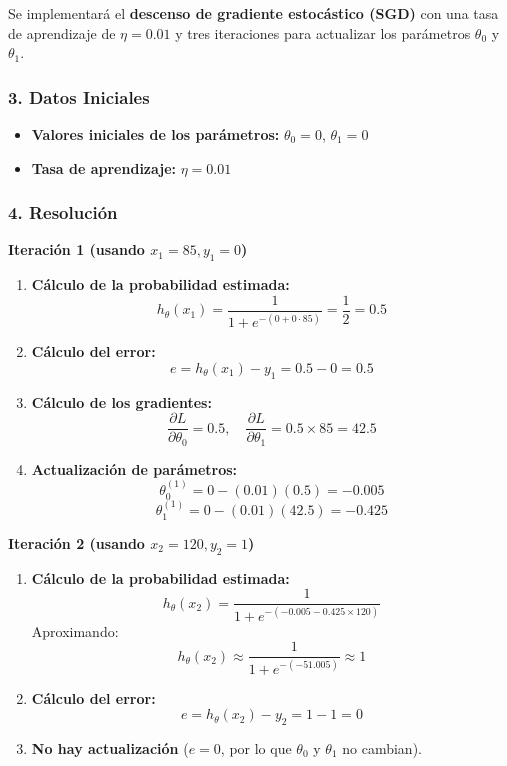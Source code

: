 \documentclass[a5paper]{article}
\begin{document}
	Se implementará el \textbf{descenso de gradiente estocástico (SGD)} con una tasa de aprendizaje de \( \eta = 0.01 \) y tres iteraciones para actualizar los parámetros \( \theta_0 \) y \( \theta_1 \).
	
	\subsubsection*{3. Datos Iniciales}
	
	\begin{itemize}
		\item \textbf{Valores iniciales de los parámetros:} \( \theta_0 = 0 \), \( \theta_1 = 0 \)
		\item \textbf{Tasa de aprendizaje:} \( \eta = 0.01 \)
	\end{itemize}
	
	\subsubsection*{4. Resolución}
	
	\textbf{Iteración 1 (usando \( x_1 = 85, y_1 = 0 \))}
	
	\begin{enumerate}
		\item \textbf{Cálculo de la probabilidad estimada:}
		\[
		h_\theta(x_1) = \frac{1}{1 + e^{-(0 + 0 \cdot 85)}} = \frac{1}{2} = 0.5
		\]
		
		\item \textbf{Cálculo del error:}
		\[
		e = h_\theta(x_1) - y_1 = 0.5 - 0 = 0.5
		\]
		
		\item \textbf{Cálculo de los gradientes:}
		\[
		\frac{\partial L}{\partial \theta_0} = 0.5, \quad \frac{\partial L}{\partial \theta_1} = 0.5 \times 85 = 42.5
		\]
		
		\item \textbf{Actualización de parámetros:}
		\[
		\theta_0^{(1)} = 0 - (0.01)(0.5) = -0.005
		\]
		\[
		\theta_1^{(1)} = 0 - (0.01)(42.5) = -0.425
		\]
	\end{enumerate}
	
	\textbf{Iteración 2 (usando \( x_2 = 120, y_2 = 1 \))}
	
	\begin{enumerate}
		\item \textbf{Cálculo de la probabilidad estimada:}
		\[
		h_\theta(x_2) = \frac{1}{1 + e^{-(-0.005 - 0.425 \times 120)}}
		\]
		Aproximando:
		\[
		h_\theta(x_2) \approx \frac{1}{1 + e^{-(-51.005)}} \approx 1
		\]
		
		\item \textbf{Cálculo del error:}
		\[
		e = h_\theta(x_2) - y_2 = 1 - 1 = 0
		\]
		
		\item \textbf{No hay actualización} (\( e = 0 \), por lo que \( \theta_0 \) y \( \theta_1 \) no cambian).
	\end{enumerate}
	
\end{document}
